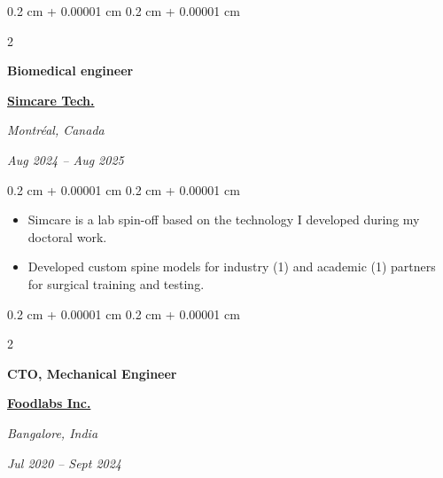 \documentclass[10pt, letterpaper]{article}
\newenvironment{highlights}{
    \begin{itemize}[
        topsep=0.10 cm,
        parsep=0.10 cm,
        partopsep=0pt,
        itemsep=0pt,
        leftmargin=0.4 cm + 10pt
    ]
}{
    \end{itemize}
} %
\newenvironment{onecolentry}{
    \begin{adjustwidth}{
        0.2 cm + 0.00001 cm
    }{
        0.2 cm + 0.00001 cm
    }
}{
    \end{adjustwidth}
} %
\newenvironment{twocolentry}[2][]{
    \onecolentry
    \def\secondColumn{#2}
    \setcolumnwidth{\fill, 4.5 cm}
    \begin{paracol}{2}
}{
    \switchcolumn \raggedleft \secondColumn
    \end{paracol}
    \endonecolentry
} %
\let\hrefWithoutArrow\href
\renewcommand{\href}[2]{\hrefWithoutArrow{#1}{\ifthenelse{\equal{#2}{}}{ }{#2 }\raisebox{.15ex}{\footnotesize \faExternalLink*}}}
\begin{document}
            



        \begin{twocolentry}{
        \textit{Montréal, Canada}    
            
        \textit{Aug 2024 – Aug 2025}}
            \textbf{Biomedical engineer}

            \textbf{\hrefWithoutArrow{https://www.simcare.tech/}{Simcare Tech.}}
        \end{twocolentry}

        \vspace{0.10 cm}
        \begin{onecolentry}
            \begin{highlights}
                \item Simcare is a lab spin-off based on the technology I developed during my doctoral work. 
                \item Developed custom spine models for industry (1) and academic (1) partners for surgical training and testing.
            \end{highlights}
        \end{onecolentry}
        \vspace{0.2 cm}


        \begin{twocolentry}{
        \textit{Bangalore, India}    
            
        \textit{Jul 2020 – Sept 2024}}
            \textbf{CTO, Mechanical Engineer}

            \textbf{\hrefWithoutArrow{https://www.foodlabs.ai/}{Foodlabs Inc.}}
        \end{twocolentry}
\end{document}
